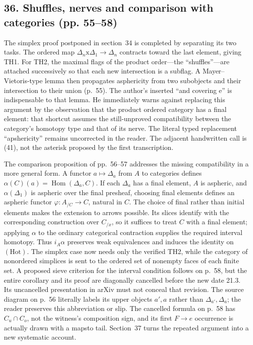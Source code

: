 \subsection*{36. Shuffles, nerves and comparison with categories (pp. 55--58)}
The simplex proof postponed in section~34 is completed by separating its two tasks. The ordered map $\Delta_n\mathrm{x}\Delta_1\to\Delta_n$ contracts toward the last element, giving TH1. For TH2, the maximal flags of the product order---the ``shuffles''---are attached successively so that each new intersection is a subflag. A Mayer--Vietoris-type lemma then propagates asphericity from two subobjects and their intersection to their union (p.~55). The author's inserted ``and covering e'' is indispensable to that lemma. He immediately warns against replacing this argument by the observation that the product ordered category has a final element: that shortcut assumes the still-unproved compatibility between the category's homotopy type and that of its nerve. The literal typed replacement ``apshericity'' remains uncorrected in the reader. The adjacent handwritten call is (41), not the asterisk proposed by the first transcription.

The comparison proposition of pp.~56--57 addresses the missing compatibility in a more general form. A functor $a\mapsto\Delta_a$ from $A$ to categories defines $\alpha(C)(a)=\operatorname{Hom}(\Delta_a,C)$. If each $\Delta_a$ has a final element, $A$ is aspheric, and $\alpha(\Delta_1)$ is aspheric over the final presheaf, choosing final elements defines an aspheric functor $\varphi:A_{/C}\to C$, natural in $C$. The choice of final rather than initial elements makes the extension to arrows possible. Its slices identify with the corresponding construction over $C_{/x}$, so it suffices to treat $C$ with a final element; applying $\alpha$ to the ordinary categorical contraction supplies the required interval homotopy. Thus $i_A\alpha$ preserves weak equivalences and induces the identity on $(\mathrm{Hot})$. The simplex case now needs only the verified TH2, while the category of nonordered simplices is sent to the ordered set of nonempty faces of each finite set. A proposed sieve criterion for the interval condition follows on p.~58, but the entire corollary and its proof are diagonally cancelled before the new date 21.3. Its uncancelled presentation in arXiv must not conceal that revision. The source diagram on p.~56 literally labels its upper objects $a',a$ rather than $\Delta_{a'},\Delta_a$; the reader preserves this abbreviation or slip. The cancelled formula on p.~58 has $C_u\cap C_o$, not the witness's composition sign, and its first $F\to e$ occurrence is actually drawn with a mapsto tail. Section~37 turns the repeated argument into a new systematic account.


